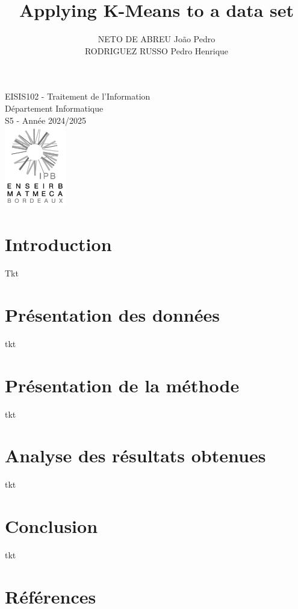 \documentclass[a4paper,12pt]{article}
\title{Applying K-Means to a data set}
\author{NETO DE ABREU Jo\~ao Pedro \\ RODRIGUEZ RUSSO Pedro Henrique}
\date{}
\begin{document}
\maketitle

\begin{center}
  \large
  EISIS102 - Traitement de l'Information \\
  Département Informatique\\
  S5 - Année 2024/2025\\
  \vfill
  \includegraphics[width=0.2\textwidth]{enseirb-matmeca.png}
\end{center}

\newpage

\tableofcontents

\newpage

\section{Introduction}
Tkt

\section{Présentation des données}
tkt

\section{Présentation de la méthode}
tkt

\section{Analyse des résultats obtenues}
tkt

\section{Conclusion}
tkt

\section*{Références}
\end{document}

